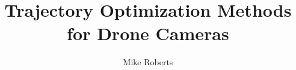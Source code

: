 \documentclass{report}
\begin{document}
\title{
Trajectory Optimization Methods for Drone Cameras}

\author{Mike Roberts}

\beforepreface




\afterpreface




\appendix





\end{document}
